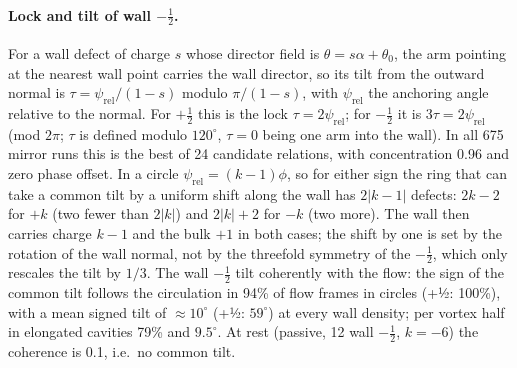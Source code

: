\documentclass[aps,prl,onecolumn,superscriptaddress,amsmath,amssymb,nofootinbib]{revtex4-2}
\newcommand{\half}{\tfrac12}
\begin{document}
\paragraph{Lock and tilt of wall $-\half$.} For a wall defect of charge $s$ whose director field is $\theta=s\alpha+\theta_0$, the arm pointing at the nearest wall point
carries the wall director, so its tilt from the outward normal is $\tau=\psi_\mathrm{rel}/(1-s)$ modulo $\pi/(1-s)$, with $\psi_\mathrm{rel}$ the anchoring angle
relative to the normal. For $+\half$ this is the lock $\tau=2\psi_\mathrm{rel}$; for $-\half$ it is $3\tau=2\psi_\mathrm{rel}$ (mod $2\pi$; $\tau$ is defined modulo
$120^\circ$, $\tau=0$ being one arm into the wall). In all 675 mirror runs this is the best of 24 candidate relations, with concentration 0.96 and zero phase offset.
In a circle $\psi_\mathrm{rel}=(k-1)\phi$, so for either sign the ring that can take a common tilt by a uniform shift along the wall has $2|k-1|$ defects: $2k-2$ for
$+k$ (two fewer than $2|k|$) and $2|k|+2$ for $-k$ (two more). The wall then carries charge $k-1$ and the bulk $+1$ in both cases; the shift by one is set by the
rotation of the wall normal, not by the threefold symmetry of the $-\half$, which only rescales the tilt by $1/3$. The wall $-\half$ tilt coherently with the flow:
the sign of the common tilt follows the circulation in 94\% of flow frames in circles (+½: 100\%), with a mean signed tilt of $\approx10^\circ$ (+½: $59^\circ$) at
every wall density; per vortex half in elongated cavities 79\% and $9.5^\circ$. At rest (passive, 12 wall $-\half$, $k=-6$) the coherence is 0.1, i.e.\ no common tilt.
\end{document}
